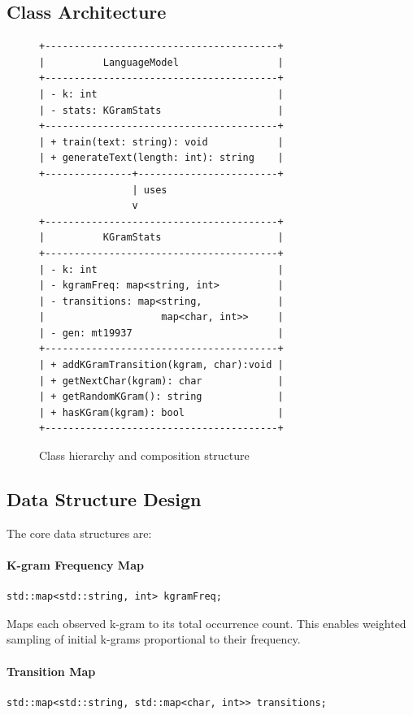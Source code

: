\documentclass[11pt,letterpaper]{article}
\begin{document}
\subsection{Class Architecture}

\begin{figure}[h]
\centering
\begin{verbatim}
+----------------------------------------+
|          LanguageModel                 |
+----------------------------------------+
| - k: int                               |
| - stats: KGramStats                    |
+----------------------------------------+
| + train(text: string): void            |
| + generateText(length: int): string    |
+---------------+------------------------+
                | uses
                v
+----------------------------------------+
|          KGramStats                    |
+----------------------------------------+
| - k: int                               |
| - kgramFreq: map<string, int>          |
| - transitions: map<string,             |
|                    map<char, int>>     |
| - gen: mt19937                         |
+----------------------------------------+
| + addKGramTransition(kgram, char):void |
| + getNextChar(kgram): char             |
| + getRandomKGram(): string             |
| + hasKGram(kgram): bool                |
+----------------------------------------+
\end{verbatim}
\caption{Class hierarchy and composition structure}
\label{fig:architecture}
\end{figure}

\subsection{Data Structure Design}

The core data structures are:

\paragraph{K-gram Frequency Map}
\begin{verbatim}
std::map<std::string, int> kgramFreq;
\end{verbatim}

Maps each observed k-gram to its total occurrence count. This enables weighted sampling of initial k-grams proportional to their frequency.

\paragraph{Transition Map}
\begin{verbatim}
std::map<std::string, std::map<char, int>> transitions;
\end{verbatim}
\end{document}
